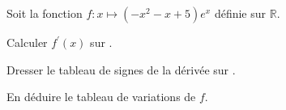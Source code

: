 \documentclass[11pt,a4paper]{article}  %
\begin{document}

Soit la fonction $f: x \mapsto\left(-x^2-x+5\right) e^x$ définie sur $\mathbb{R}$.

\begin{enumMet}
	\item {} Calculer $f^{\prime}(x)$ sur \R.
	\item {} Dresser le tableau de signes de la dérivée sur \R.
	\item {} En déduire le tableau de variations de $f$.
\end{enumMet}
\end{document}
